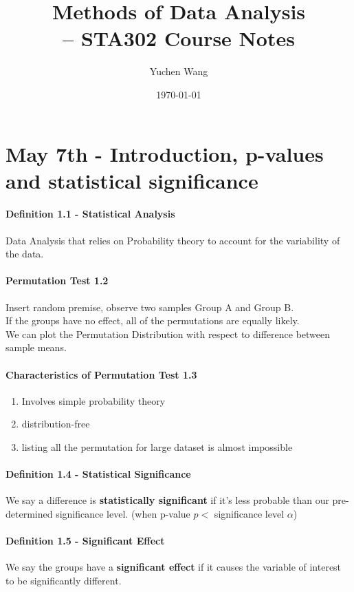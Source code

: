 \documentclass[11pt]{article}
\title{Methods of Data Analysis \\ -- STA302 Course Notes}
\author{Yuchen Wang}
\date{\today}
\begin{document}
    \maketitle
    \tableofcontents
    \newpage
\section{May 7th - Introduction, p-values and statistical significance}
\paragraph{Definition 1.1 - Statistical Analysis} 
Data Analysis that relies on Probability theory to account for the variability of the data.
\paragraph{Permutation Test 1.2}
Insert random premise, observe two samples Group A and Group B. \\
If the groups have no effect, all of the permutations are equally likely. \\
We can plot the Permutation Distribution with respect to difference between sample means.
\paragraph{Characteristics of Permutation Test 1.3}
\begin{enumerate}
	\item Involves simple probability theory
	\item distribution-free
	\item listing all the permutation for large dataset is almost impossible
\end{enumerate}

\paragraph{Definition 1.4 - Statistical Significance}
We say a difference is \textbf{statistically significant} if it's less probable than our pre-determined significance level. (when p-value $p <$  significance level $\alpha$)
\paragraph{Definition 1.5 - Significant Effect} We say the groups have a \textbf{significant effect} if it causes the variable of interest to be significantly different.
\end{document}
